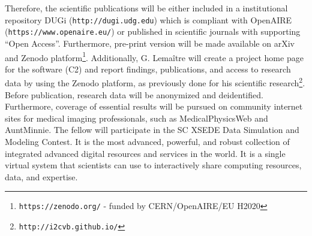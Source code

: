 Therefore, the scientific publications will be either included in a institutional repository DUGi (\texttt{http://dugi.udg.edu}) which is compliant with OpenAIRE (\texttt{https://www.openaire.eu/}) or published in scientific journals with supporting ``Open Access''.
Furthermore, pre-print version will be made available on arXiv and Zenodo platform\footnote{\texttt{https://zenodo.org/} - funded by CERN/OpenAIRE/EU H2020}.
Additionally, G. Lema\^itre  will create a project home page for the software (C2) and report findings, publications, and access to research data by using the Zenodo platform, as previously done for his scientific research\footnote{\texttt{http://i2cvb.github.io/}}.
Before publication, research data will be anonymized and deidentified.
Furthermore, coverage of essential results will be pursued on community internet sites for medical imaging professionals, such as MedicalPhysicsWeb and AuntMinnie.
The fellow will participate in the SC XSEDE Data Simulation and Modeling Contest.
It is the most advanced, powerful, and robust collection of integrated advanced digital resources and services in the world.
It is a single virtual system that scientists can use to interactively share computing resources, data, and expertise.


